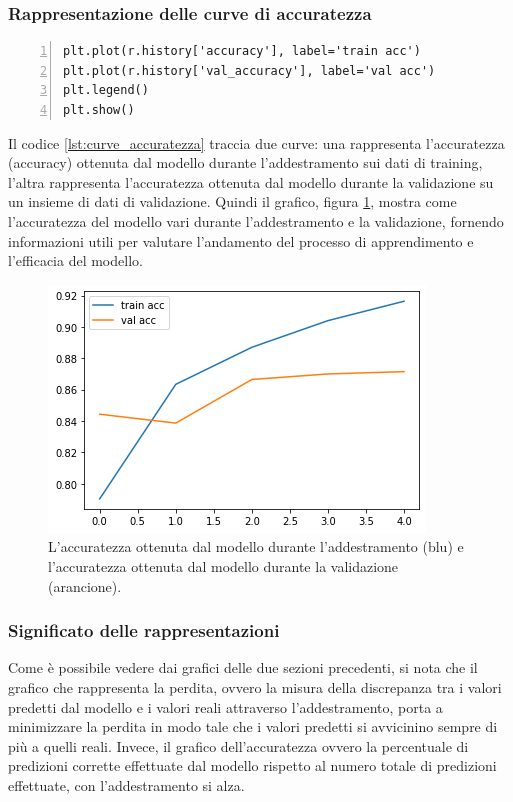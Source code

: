 \documentclass[a4paper,final,12pt]{report}
\begin{document}
\subsubsection{Rappresentazione delle curve di accuratezza}
\begin{lstlisting}[caption={Codice per il grafico delle curve di accuratezza.}, label={lst:curve_accuratezza}, breaklines, escapechar=`\%, frame=lines, basicstyle=\small\ttfamily, keepspaces=true, numbers=left]
plt.plot(r.history['accuracy'], label='train acc')
plt.plot(r.history['val_accuracy'], label='val acc')
plt.legend()
plt.show()
\end{lstlisting}
Il codice \ref{lst:curve_accuratezza} traccia due curve: una rappresenta l'accuratezza (accuracy) ottenuta dal modello durante l'addestramento sui dati di training, l'altra rappresenta l'accuratezza ottenuta dal modello durante la validazione su un insieme di dati di validazione. Quindi il grafico, figura \ref{figura:azs}, mostra come l'accuratezza del modello vari durante l'addestramento e la validazione, fornendo informazioni utili per valutare l'andamento del processo di apprendimento e l'efficacia del modello. 
\begin{figure}[hbtp]
\centering
\includegraphics[scale=0.80]{img_concettuale/grpPP.png}
\caption{L'accuratezza ottenuta dal modello durante l'addestramento (blu) e l'accuratezza ottenuta dal modello durante la validazione (arancione).}
\label{figura:azs}
\end{figure}

\subsubsection{Significato delle rappresentazioni}
Come è possibile vedere dai grafici delle due sezioni precedenti, si nota che
il grafico che rappresenta la perdita, ovvero la misura della discrepanza tra i valori predetti dal modello e i valori reali attraverso l'addestramento, porta a minimizzare la perdita in modo tale che i valori predetti si avvicinino sempre di più a quelli reali. Invece, il grafico dell'accuratezza ovvero la percentuale di predizioni corrette effettuate dal modello rispetto al numero totale di predizioni effettuate, con l'addestramento si alza.
\end{document}
